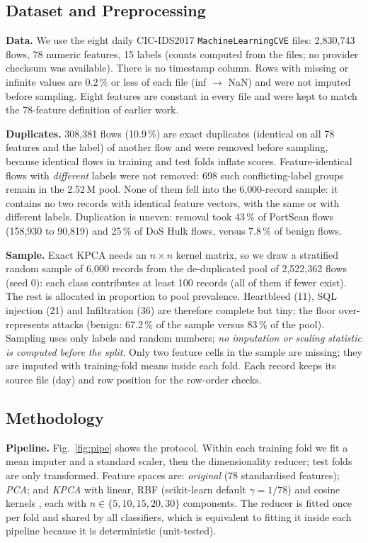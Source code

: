 \documentclass[runningheads]{llncs}
\begin{document}
\subsection{Dataset and Preprocessing}\label{sec:data}
\textbf{Data.} We use the eight daily CIC-IDS2017 \texttt{MachineLearningCVE} files: 2{,}830{,}743 flows, 78 numeric features, 15 labels (counts computed from the files; no provider checksum was available). There is no timestamp column. Rows with missing or infinite values are 0.2\,\% or less of each file (inf $\to$ NaN) and were not imputed before sampling. Eight features are constant in every file and were kept to match the 78-feature definition of earlier work.

\textbf{Duplicates.} 308{,}381 flows (10.9\,\%) are exact duplicates (identical on all 78 features and the label) of another flow and were removed before sampling, because identical flows in training and test folds inflate scores. Feature-identical flows with \emph{different} labels were not removed: 698 such conflicting-label groups remain in the 2.52\,M pool. None of them fell into the 6{,}000-record sample: it contains no two records with identical feature vectors, with the same or with different labels. Duplication is uneven: removal took 43\,\% of PortScan flows (158{,}930 to 90{,}819) and 25\,\% of DoS Hulk flows, versus 7.8\,\% of benign flows.

\textbf{Sample.} Exact KPCA needs an $n\times n$ kernel matrix, so we draw a stratified random sample of 6{,}000 records from the de-duplicated pool of 2{,}522{,}362 flows (seed 0): each class contributes at least 100 records (all of them if fewer exist). The rest is allocated in proportion to pool prevalence. Heartbleed (11), SQL injection (21) and Infiltration (36) are therefore complete but tiny; the floor over-represents attacks (benign: 67.2\,\% of the sample versus 83\,\% of the pool). Sampling uses only labels and random numbers; \emph{no imputation or scaling statistic is computed before the split}. Only two feature cells in the sample are missing; they are imputed with training-fold means inside each fold. Each record keeps its source file (day) and row position for the row-order checks.



\subsection{Methodology}\label{sec:method}
\textbf{Pipeline.} Fig.~\ref{fig:pipe} shows the protocol. Within each training fold we fit a mean imputer and a standard scaler, then the dimensionality reducer; test folds are only transformed. Feature spaces are: \emph{original} (78 standardised features); \emph{PCA}; and \emph{KPCA} with linear, RBF (scikit-learn default $\gamma=1/78$) and cosine kernels , each with $n\in\{5,10,15,20,30\}$ components. The reducer is fitted once per fold and shared by all classifiers, which is equivalent to fitting it inside each pipeline because it is deterministic (unit-tested).
\end{document}
